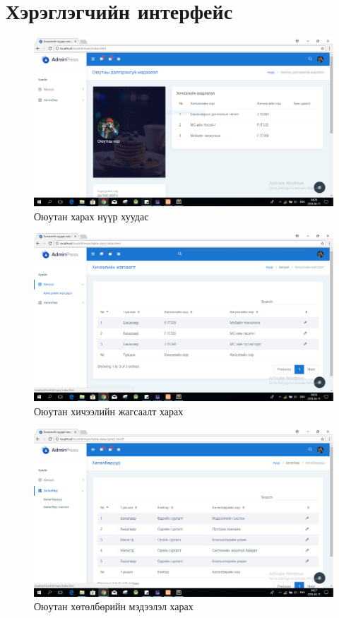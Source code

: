 \newpage
\section{Хэрэглэгчийн интерфейс }

	\begin{figure}[!h]
		\includegraphics[scale=0.42]{Chart/screen-1}
		\caption[Оюутан харах нүүр хуудас]{Оюутан харах нүүр хуудас}
		\label{text}
	\end{figure}

	\begin{figure}[!h]
		\includegraphics[scale=0.42]{Chart/screen-2}
		\caption[Оюутан хичээлийн жагсаалт харах]{Оюутан хичээлийн жагсаалт харах}
		\label{text}
	\end{figure}
	
	\begin{figure}[!h]
		\includegraphics[scale=0.47]{Chart/screen-3}
		\caption[Оюутан хөтөлбөрийн мэдээлэл харах]{Оюутан хөтөлбөрийн мэдээлэл харах}
		\label{text}
	\end{figure}
	
